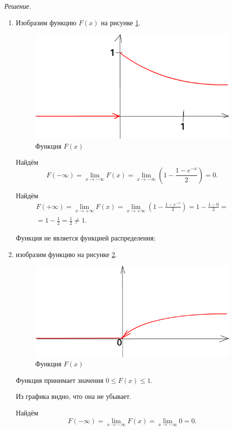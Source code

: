 \textit{Решение.}
\begin{enumerate}[label=\alph*)]
\item Изобразим функцию $F \left( x \right) $ на рисунке \ref{fig:918}.

\begin{figure}[h!]
  \centering
  \includegraphics[width=.4\textwidth]{./pictures/9_18.png}
  \caption{Функция $F \left( x \right) $}
  \label{fig:918}
\end{figure}

Найдём
$$F \left( - \infty \right) =
\lim \limits_{x \to - \infty } F \left( x \right) =
\lim \limits_{x \to - \infty } \left( 1 - \frac{1-e^{-x}}{2} \right) =
0.$$

Найдём
\begin{equation*}
\begin{split}
F \left( + \infty \right) =
\lim \limits_{x \to + \infty } F \left( x \right) =
\lim \limits_{x \to + \infty } \left( 1 - \frac{1-e^{-x}}{2} \right) =
1 - \frac{1-0}{2} = \\
= 1 - \frac{1}{2} =
\frac{1}{2} \neq
1.
\end{split}
\end{equation*}

Функция не является функцией распределения;
\item изобразим функцию на рисунке \ref{fig:9181}.

\begin{figure}[h!]
  \centering
  \includegraphics[width=.4\textwidth]{./pictures/9_18_1.png}
  \caption{Функция $F \left( x \right) $}
  \label{fig:9181}
\end{figure}

Функция принимает значения $0 \leq F \left( x \right) \leq 1$.

Из графика видно, что она не убывает.

Найдём
$$F \left( - \infty \right) =
\lim \limits_{x \to - \infty } F \left( x \right) =
\lim \limits_{x \to - \infty} 0 =
0.$$


\end{enumerate}
